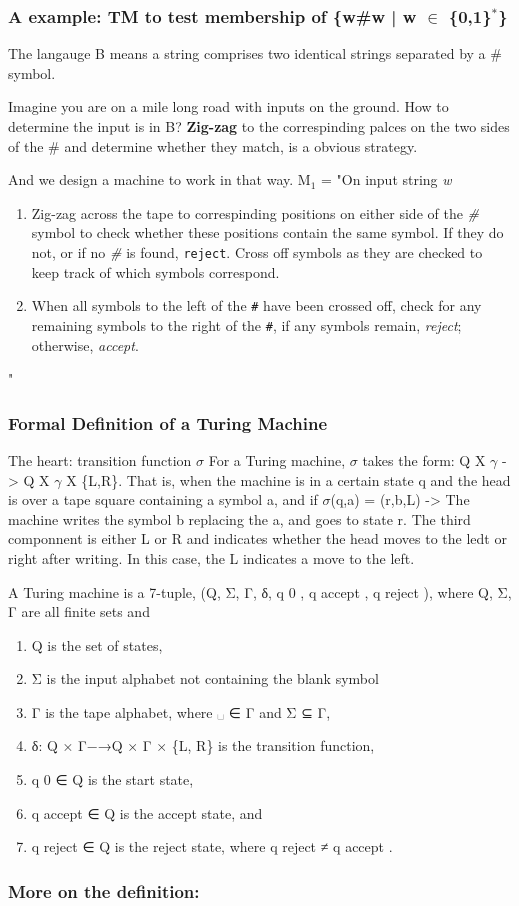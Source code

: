 \documentclass[11pt]{article}
\begin{document}
\subsubsection{A example: TM to test membership of \{w\#w | w \(\in\) \{0,1\}\(^{\text{*}}\)\}}
\label{sec:org2f184da}

The langauge B means a string comprises two identical strings separated by a \# symbol.

Imagine you are on a mile long road with inputs on the ground. How to determine the input is in B? \textbf{Zig-zag} to the correspinding palces on the two sides of the \# and determine whether they match, is a obvious strategy.

And we design a machine to work in that way. 
M\(_{\text{1}}\) = "On input string \emph{w}
\begin{enumerate}
\item Zig-zag across the tape to correspinding positions on either side of the \emph{\#} symbol to check whether these positions contain the same symbol. 
If they do not, or if no \emph{\#} is found, \texttt{reject}. Cross off symbols as they are checked to keep track of which symbols correspond.
\item When all symbols to the left of the \texttt{\#} have been crossed off, check for any remaining symbols to the right of the \texttt{\#}, if any symbols remain, \emph{reject}; otherwise, \emph{accept}.
\end{enumerate}
"







\subsubsection{Formal Definition of a Turing Machine}
\label{sec:org4babc0c}

The heart: transition function \(\sigma\)
For a Turing machine, \(\sigma\) takes the form: Q X \(\gamma\) -> Q X \(\gamma\) X \{L,R\}. That is, when the machine is in a certain state q and the head is over a tape square containing a symbol a, and if \(\sigma\)(q,a) = (r,b,L)
-> The machine writes the symbol b replacing the a, and goes to state r. The third componnent is either L or R and indicates whether the head moves to the ledt or right after writing. In this case, the L indicates a move to the left.

A Turing machine is a 7-tuple, (Q, Σ, Γ, δ, q 0 , q accept , q reject ), where Q, Σ, Γ are all ﬁnite sets and
\begin{enumerate}
\item Q is the set of states,
\item Σ is the input alphabet not containing the blank symbol
\item Γ is the tape alphabet, where ␣ ∈ Γ and Σ ⊆ Γ,
\item δ: Q × Γ−→Q × Γ × \{L, R\} is the transition function,
\item q 0 ∈ Q is the start state,
\item q accept ∈ Q is the accept state, and
\item q reject ∈ Q is the reject state, where q reject ≠ q accept .
\end{enumerate}
\subsubsection{More on the definition:}
\label{sec:org3266596}
\capitalsigma 
\end{document}
